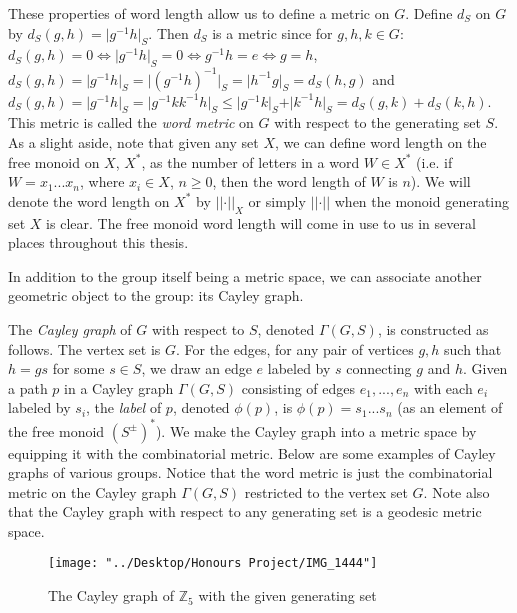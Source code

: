 \documentclass[12pt]{article}
\newcommand{\vs}{\vskip10pt}
\begin{document}
	These properties of word length allow us to define a metric on $G$. Define $d_S$ on $G$ by $d_S(g,h) = \vert g^{-1}h \vert_S$. Then $d_S$ is a metric since for $g,h,k \in G$: $d_S(g,h) = 0 \iff \vert g^{-1} h \vert_S = 0 \iff g^{-1} h = e \iff g = h$, $d_S(g,h) = \vert g^{-1}h \vert_S = \vert (g^{-1}h)^{-1} \vert_S = \vert h^{-1} g \vert_S = d_S(h,g)$ and $d_S(g,h) = \vert g^{-1} h \vert_S = \vert g^{-1} k k^{-1} h \vert_S \leq \vert g^{-1} k \vert_S + \vert k^{-1} h \vert_S = d_S(g,k) + d_S(k,h)$. This metric is called the \textit{word metric} on $G$ with respect to the generating set $S$. As a slight aside, note that given any set $X$, we can define word length on the free monoid on $X$, $X^*$, as the number of letters in a word $W \in X^*$ (i.e. if $W = x_1...x_n$, where $x_i \in X$, $n \geq 0$, then the word length of $W$ is $n$). We will denote the word length on $X^*$ by $\vert \vert \cdot \vert \vert_X$ or simply $\vert \vert \cdot \vert \vert$ when the monoid generating set $X$ is clear. The free monoid word length will come in use to us in several places throughout this thesis.
	
	\vs 
	
	In addition to the group itself being a metric space, we can associate another geometric object to the group: its Cayley graph.
	
	\vs 
	
	The \textit{Cayley graph} of $G$ with respect to $S$, denoted $\Gamma(G, S)$, is constructed as follows. The vertex set is $G$. For the edges, for any pair of vertices $g, h$ such that $h = gs$ for some $s \in S$, we draw an edge $e$ labeled by $s$ connecting $g$ and $h$. Given a path $p$ in a Cayley graph $\Gamma(G,S)$ consisting of edges $e_1,...,e_n$ with each $e_i$ labeled by $s_i$, the \textit{label} of $p$, denoted $\phi(p)$, is $\phi(p) = s_1...s_n$ (as an element of the free monoid $(S^{\pm})^*$). We make the Cayley graph into a metric space by equipping it with the combinatorial metric. Below are some examples of Cayley graphs of various groups. Notice that the word metric is just the combinatorial metric on the Cayley graph $\Gamma(G, S)$ restricted to the vertex set $G$. Note also that the Cayley graph with respect to any generating set is a geodesic metric space. 
	
	
\begin{figure} [H]
	\centering
	\texttt{[image: "../Desktop/Honours Project/IMG\_1444"]}
	\caption{The Cayley graph of $\mathbb{Z}_5$ with the given generating set}
	\label{fig:img1444}
\end{figure}
\end{document}
